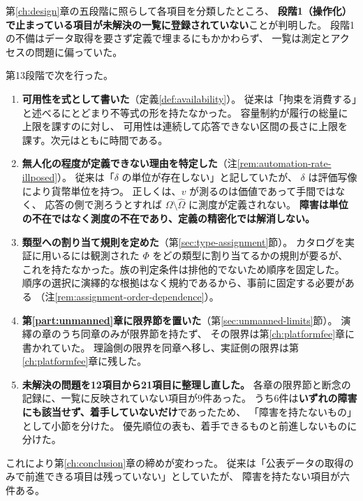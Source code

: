 第\ref{ch:design}章の五段階に照らして各項目を分類したところ、
\textbf{段階1（操作化）で止まっている項目が未解決の一覧に登録されていない}ことが判明した。
段階1の不備はデータ取得を要さず定義で埋まるにもかかわらず、
一覧は測定とアクセスの問題に偏っていた。

第13段階で次を行った。

\begin{enumerate}[label=(\arabic*)]
\item \textbf{可用性を式として書いた}（定義\ref{def:availability}）。
従来は「拘束を消費する」と述べるにとどまり不等式の形を持たなかった。
容量制約が履行の総量に上限を課すのに対し、
可用性は連続して応答できない区間の長さに上限を課す。次元はともに時間である。

\item \textbf{無人化の程度が定義できない理由を特定した}（注\ref{rem:automation-rate-illposed}）。
従来は「$\delta$ の単位が存在しない」と記していたが、
$\delta$ は評価写像により貨幣単位を持つ。
正しくは、$v$ が測るのは価値であって手間ではなく、
応答の側で測ろうとすれば $\Omega\setminus\hat\Omega$ に測度が定義されない。
\textbf{障害は単位の不在ではなく測度の不在であり、定義の精密化では解消しない。}

\item \textbf{類型への割り当て規則を定めた}（第\ref{sec:type-assignment}節）。
カタログを実証に用いるには観測された $\Phi$ をどの類型に割り当てるかの規則が要るが、
これを持たなかった。族の判定条件は排他的でないため順序を固定した。
順序の選択に演繹的な根拠はなく規約であるから、事前に固定する必要がある
（注\ref{rem:assignment-order-dependence}）。

\item \textbf{第\ref{part:unmanned}章に限界節を置いた}（第\ref{sec:unmanned-limits}節）。
演繹の章のうち同章のみが限界節を持たず、
その限界は第\ref{ch:platformfee}章に書かれていた。
理論側の限界を同章へ移し、実証側の限界は第\ref{ch:platformfee}章に残した。

\item \textbf{未解決の問題を12項目から21項目に整理し直した。}
各章の限界節と断念の記録に、一覧に反映されていない項目が9件あった。
うち6件は\textbf{いずれの障害にも該当せず、着手していないだけ}であったため、
「障害を持たないもの」として小節を分けた。
優先順位の表も、着手できるものと前進しないものに分けた。
\end{enumerate}

これにより第\ref{ch:conclusion}章の締めが変わった。
従来は「公表データの取得のみで前進できる項目は残っていない」としていたが、
障害を持たない項目が六件ある。

